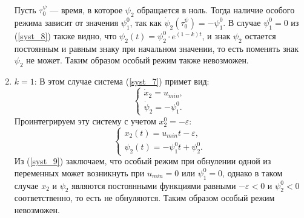\documentclass[10pt]{article}
\begin{document}
\begin{enumerate}
	Пусть \( \tau_0^{\psi} \) --- время, в которое \( \psi_2 \) обращается в ноль. Тогда наличие особого режима зависит от значения \( \psi_1^0 \), так как \( \dot{\psi}_2(\tau_0^{\psi}) = -\psi_1^0\). В случае \( \psi_1^0 = 0 \) из (\ref{syst_8}) также видно, что \( \psi_2(t) = \psi_2^0 \cdot e^{(1-k)t} \), и знак \( \psi_2 \) остается постоянным и равным знаку при начальном значении, то есть поменять знак \( \psi_2 \) не может. Таким образом особый режим также невозможен. 
	\item \( k = 1 \):
		В этом случае система (\ref{syst_7}) примет вид:
		\begin{equation} \label{syst_9}
			\begin{cases}
				\dot{x}_2 = u_{min}, 
				\\
				\dot{\psi}_2 = - \psi_1^0.
			\end{cases}
		\end{equation}
	Проинтегрируем эту систему с учетом \( x_2^0 = -\varepsilon \):
	\[\begin{cases}
		x_2(t) = u_{min} t - \varepsilon,
		\\
		\psi_2(t) = -\psi_1^0 t + \psi_2^0.
	\end{cases} \]
	Из (\ref{syst_9}) заключаем, что особый режим при обнулении одной из переменных может возникнуть при \(u_{min} = 0 \) или \( \psi_1^0 = 0 \), однако в таком случае \( x_2 \) и \( \psi_2 \) являются постоянными функциями равными \( -\varepsilon < 0\) и \( \psi_2^0 < 0\) соответственно, то есть не обнуляются. Таким образом особый режим невозможен.
\end{enumerate}
	
\end{document}
